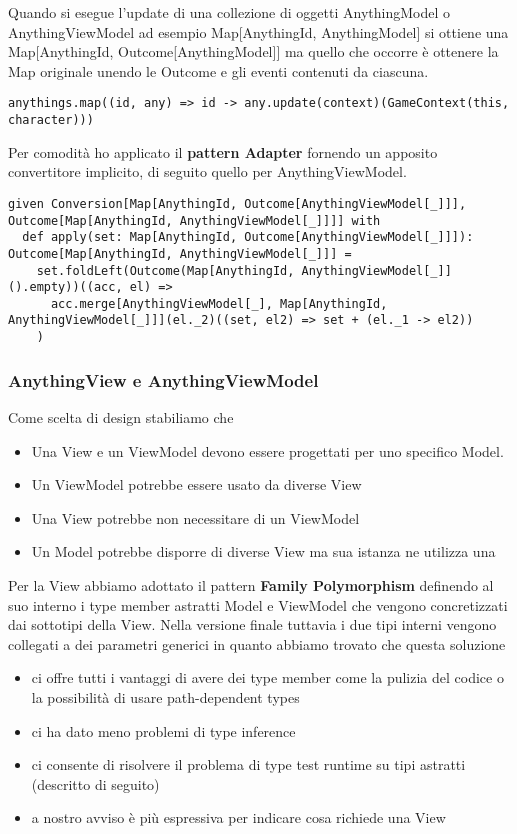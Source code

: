 Quando si esegue l'update di una collezione di oggetti AnythingModel o AnythingViewModel ad esempio Map[AnythingId, AnythingModel] si ottiene una Map[AnythingId, Outcome[AnythingModel]] ma quello che occorre è ottenere la Map originale unendo le Outcome e gli eventi contenuti da ciascuna.

\begin{lstlisting}[basicstyle=\tiny]
anythings.map((id, any) => id -> any.update(context)(GameContext(this, character)))
\end{lstlisting}

Per comodità ho applicato il \textbf{pattern Adapter} fornendo un apposito convertitore implicito, di seguito quello per AnythingViewModel.

\begin{lstlisting}[basicstyle=\tiny]
given Conversion[Map[AnythingId, Outcome[AnythingViewModel[_]]], Outcome[Map[AnythingId, AnythingViewModel[_]]]] with
  def apply(set: Map[AnythingId, Outcome[AnythingViewModel[_]]]): Outcome[Map[AnythingId, AnythingViewModel[_]]] =
    set.foldLeft(Outcome(Map[AnythingId, AnythingViewModel[_]]().empty))((acc, el) =>
      acc.merge[AnythingViewModel[_], Map[AnythingId, AnythingViewModel[_]]](el._2)((set, el2) => set + (el._1 -> el2))
    )
\end{lstlisting}

\subsubsection{AnythingView e AnythingViewModel}
Come scelta di design stabiliamo che 
\begin{itemize}
    \item Una View e un ViewModel devono essere progettati per uno specifico Model. 
    \item Un ViewModel potrebbe essere usato da diverse View
    \item Una View potrebbe non necessitare di un ViewModel
    \item Un Model potrebbe disporre di diverse View ma sua istanza ne utilizza una
\end{itemize}
Per la View abbiamo adottato il pattern \textbf{Family Polymorphism} definendo al suo interno i type member astratti Model e ViewModel che vengono concretizzati dai sottotipi della View.
Nella versione finale tuttavia i due tipi interni vengono collegati a dei parametri generici in quanto abbiamo trovato che questa soluzione
\begin{itemize}
    \item ci offre tutti i vantaggi di avere dei type member come la pulizia del codice o la possibilità di usare path-dependent types
    \item ci ha dato meno problemi di type inference 
    \item ci consente di risolvere il problema di type test runtime su tipi astratti (descritto di seguito)
    \item a nostro avviso è più espressiva per indicare cosa richiede una View
\end{itemize}

